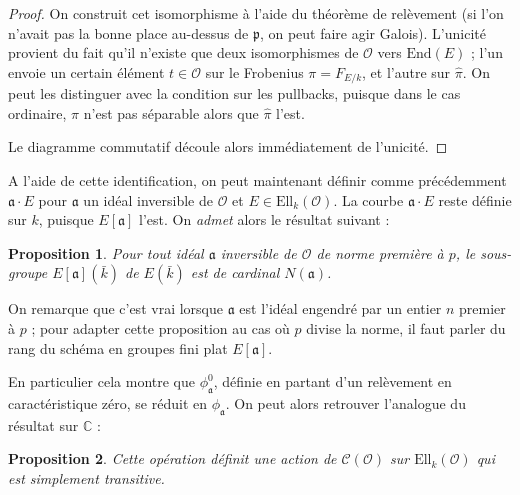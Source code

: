 \documentclass[11pt,a4paper]{article}
\newcommand{\C}{\mathbb{C}}
\renewcommand{\O}{\mathcal{O}}
\newcommand{\Cl}{\mathcal{C}}
\newcommand{\End}{\mathrm{End}}
\newcommand{\Ell}{\mathrm{Ell}}
\renewcommand{\frak}{\mathfrak}
\newtheorem*{prop}{Proposition}
\theoremstyle{definition}
\begin{document}
\begin{proof}

On construit cet isomorphisme à l'aide du théorème de relèvement (si l'on n'avait pas la bonne place au-dessus de $\frak p$, on peut faire agir Galois). L'unicité provient du fait qu'il n'existe que deux isomorphismes de $\O$ vers $\End(E)$ ; l'un envoie un certain élément $t\in \O$ sur le Frobenius $\pi = F_{E/k}$, et l'autre sur $\widehat{\pi}.$ On peut les distinguer avec la condition sur les pullbacks, puisque dans le cas ordinaire, $\pi$ n'est pas séparable alors que $\widehat{\pi}$ l'est.

Le diagramme commutatif découle alors immédiatement de l'unicité.
\end{proof}

A l'aide de cette identification, on peut maintenant définir comme précédemment $\frak a\cdot E$ pour $\frak a$ un idéal inversible de $\O$ et $E\in \Ell_k(\O)$. La courbe $\frak a\cdot E$ reste définie sur $k$, puisque $E[\frak a]$ l'est. On \emph{admet} alors le résultat suivant :

\begin{prop}

Pour tout idéal $\frak a$ inversible de $\O$ de norme première à $p$, le sous-groupe $E[\frak a](\bar{k})$ de $ E(\bar{k})$ est de cardinal $N(\frak a)$.

\end{prop}

On remarque que c'est vrai lorsque $\frak a$ est l'idéal engendré par un entier $n$ premier à $p$ ; pour adapter cette proposition au cas où $p$ divise la norme, il faut parler du rang du schéma en groupes fini plat $E[\frak a]$.

En particulier cela montre que $\phi_{\frak a}^0$, définie en partant d'un relèvement en caractéristique zéro, se réduit en $\phi_{\frak a}$. On peut alors retrouver l'analogue du résultat sur $\C$ :

\begin{prop}

Cette opération définit une action de $\Cl(\O)$ sur $\Ell_k(\O)$ qui est simplement transitive.

\end{prop}
\end{document}
